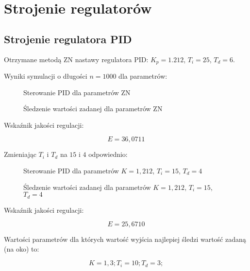 \chapter{Strojenie regulatorów}

\section{Strojenie regulatora PID}

Otrzymane metodą ZN nastawy regulatora PID: $K_p = 1.212$, $T_i = 25$, $T_d = 6$.

Wyniki symulacji o długości $n = 1000$ dla parametrów:

\begin{figure}[H]
\centering

\caption{Sterowanie PID dla parametrów ZN}
\end{figure}

\begin{figure}[H]
\centering

\caption{Śledzenie wartości zadanej dla parametrów ZN}
\end{figure}

Wskaźnik jakości regulacji:

\begin{equation}
E = 36,0711
\end{equation}

Zmieniając $T_i$ i $T_d$ na $15$ i $4$ odpowiednio:

\begin{figure}[H]
\centering

\caption{Sterowanie PID dla parametrów $K = 1,212$, $T_i = 15$, $T_d = 4$}
\end{figure}

\begin{figure}[H]
\centering

\caption{Śledzenie wartości zadanej dla parametrów $K = 1,212$, $T_i = 15$, $T_d = 4$}
\end{figure}

Wskaźnik jakości regulacji:

\begin{equation}
E = 25,6710
\end{equation}

Wartości parametrów dla których wartość wyjścia najlepiej śledzi wartość zadaną (na oko) to:

\begin{equation}
K = 1,3; T_i = 10; T_d = 3;
\end{equation}

